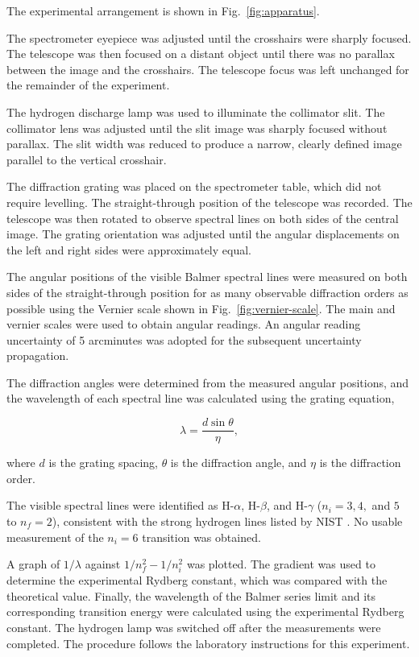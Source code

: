 \documentclass[12pt,a4paper]{article}
\begin{document}
The experimental arrangement is shown in Fig.~\ref{fig:apparatus}.

The spectrometer eyepiece was adjusted until the crosshairs
were sharply focused. The telescope was then focused on a
distant object until there was no parallax between the image
and the crosshairs. The telescope focus was left unchanged
for the remainder of the experiment.

The hydrogen discharge lamp was used to illuminate the
collimator slit. The collimator lens was adjusted until the
slit image was sharply focused without parallax. The slit
width was reduced to produce a narrow, clearly defined image
parallel to the vertical crosshair.

The diffraction grating was placed on the spectrometer table,
which did not require levelling. The straight-through position
of the telescope was recorded. The telescope was then rotated
to observe spectral lines on both sides of the central image.
The grating orientation was adjusted until the angular
displacements on the left and right sides were approximately
equal.

The angular positions of the visible Balmer spectral lines
were measured on both sides of the straight-through position
for as many observable diffraction orders as possible using
the Vernier scale shown in Fig.~\ref{fig:vernier-scale}. The
main and vernier scales were used to obtain angular readings.
An angular reading uncertainty of 5 arcminutes was adopted
for the subsequent uncertainty propagation.

The diffraction angles were determined from the measured
angular positions, and the wavelength of each spectral line
was calculated using the grating equation,

\[
\lambda = \frac{d\sin\theta}{\eta},
\]

where $d$ is the grating spacing, $\theta$ is the diffraction
angle, and $\eta$ is the diffraction order.

The visible spectral lines were identified as H-$\alpha$,
H-$\beta$, and H-$\gamma$ ($n_i=3,4,$ and $5$ to $n_f=2$),
consistent with the strong hydrogen lines listed by
NIST \cite{nistHydrogenLines}. No usable measurement of the
$n_i=6$ transition was obtained.

A graph of $1/\lambda$ against
$1/n_f^2-1/n_i^2$ was plotted. The gradient was used to
determine the experimental Rydberg constant, which was
compared with the theoretical value. Finally, the wavelength
of the Balmer series limit and its corresponding transition
energy were calculated using the experimental Rydberg constant.
The hydrogen lamp was switched off after the measurements
were completed. The procedure follows the laboratory
instructions for this experiment.\cite{py2107}
\end{document}
